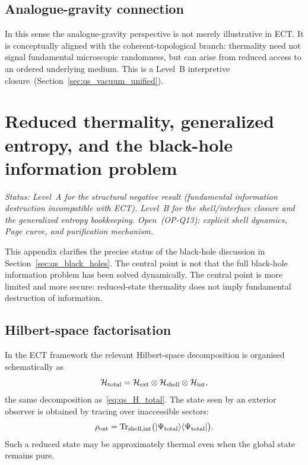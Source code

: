 \subsection*{Analogue-gravity connection}

In this sense the analogue-gravity perspective is not merely illustrative
in ECT.
It is conceptually aligned with the coherent-topological branch:
thermality need not signal fundamental microscopic randomness, but can
arise from reduced access to an ordered underlying medium.
This is a Level~B interpretive closure~(Section~\ref{sec:qs_vacuum_unified}).

\section{Reduced thermality, generalized entropy, and the
black-hole information problem}
\label{app:bh_reduced_thermality}

\textit{Status: Level~A for the structural negative result (fundamental
information destruction incompatible with ECT).
Level~B for the shell/interface closure and the generalized entropy
bookkeeping.
Open~(OP-Q13): explicit shell dynamics, Page curve, and purification
mechanism.}

\medskip
This appendix clarifies the precise status of the black-hole discussion
in Section~\ref{sec:qs_black_holes}.
The central point is not that the full black-hole information problem
has been solved dynamically.
The central point is more limited and more secure: reduced-state
thermality does not imply fundamental destruction of information.

\subsection*{Hilbert-space factorisation}

In the ECT framework the relevant Hilbert-space decomposition is
organised schematically as
\begin{equation}
  \label{eq:app_H_total}
  \mathcal{H}_{\rm total}
  =
  \mathcal{H}_{\rm ext}
  \otimes
  \mathcal{H}_{\rm shell}
  \otimes
  \mathcal{H}_{\rm int},
\end{equation}
the same decomposition as~\eqref{eq:qs_H_total}.
The state seen by an exterior observer is obtained by tracing over
inaccessible sectors:
\begin{equation}
  \label{eq:app_rho_ext}
  \rho_{\rm ext}
  =
  \mathrm{Tr}_{{\rm shell,int}}
  \bigl(|\Psi_{\rm total}\rangle\langle\Psi_{\rm total}|\bigr).
\end{equation}
Such a reduced state may be approximately thermal even when the global
state remains pure.

